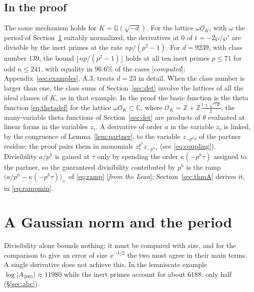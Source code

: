 \documentclass[11pt]{amsart}
\numberwithin{equation}{section}
\theoremstyle{definition}
\theoremstyle{remark}
\newcommand{\Z}{\mathbb Z}
\newcommand{\Q}{\mathbb Q}
\newcommand{\C}{\mathbb C}
\newcommand{\cO}{\mathcal O}
\newcommand{\status}[1]{\textup{[\emph{#1}]}}
\begin{document}
\subsection*{In the proof}
The same mechanism holds for $K=\Q(\sqrt{-d})$. For the lattice $\omega\cO_K$, with $\omega$ the period of Section~\ref{sec:norm} suitably normalized, the derivatives at $0$ of $t=-2\wp/\wp'$ are divisible by the inert primes at the rate $np/(p^2-1)$. For $d=9239$, with class number $139$, the bound $\lfloor np/(p^2-1)\rfloor$ holds at all ten inert primes $p\le71$ for odd $n\le241$, with equality in $96.6\%$ of the cases \status{computed}; Appendix~\ref{sec:examples}, A.3, treats $d=23$ in detail. When the class number is larger than one, the class sums of Section~\ref{sec:det} involve the lattices of all the ideal classes of $K$, as in that example. In the proof the basic function is the theta function \eqref{eq:thetadef} for the lattice $\omega\cO_K\subset\C$, where $\cO_K=\Z+\Z\frac{1+\sqrt{-d}}2$; the many-variable theta functions of Section~\ref{sec:det} are products of $\theta$ evaluated at linear forms in the variables $z_\tau$. A derivative of order $a$ in the variable $z_\tau$ is linked, by the congruence of Lemma~\ref{lem:partner}, to the variable $z_{-p^h\tau}$ of the partner residue: the proof pairs them in monomials $z_\tau^{p^h}z_{-p^h\tau}$ (see \eqref{eq:coupling}). Divisibility $a/p^h$ is gained at $\tau$ only by spending the order $\kappa(-p^h\tau)$ assigned to the partner, so the guaranteed divisibility contributed by $p^h$ is the ramp $\bigl(a/p^h-\kappa(-p^h\tau)\bigr)_+$ of \eqref{eq:ramp} \status{from the Lean}; Section~\ref{sec:thmA} derives it, in \eqref{eq:rampmin}.

\section{A Gaussian norm and the period}\label{sec:norm}

Divisibility alone bounds nothing; it must be compared with size, and for the comparison to give an error of size $x^{-1/2}$ the two must agree in their main terms. A single derivative does not achieve this. In the lemniscate example $\log|A_{2001}|\approx11980$ while the inert primes account for about $6188$: only half (\S\ref{sec:abc}).
\end{document}
